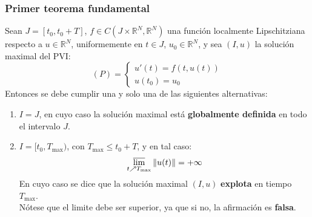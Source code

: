 \subsubsection{Primer teorema fundamental}

\begin{teorema}
    Sean $J = [t_0, t_0 + T]$, $f \in C(J \times \mathbb{R}^N, \mathbb{R}^N)$ una función localmente Lipschitziana respecto a $u \in \mathbb{R}^N$, uniformemente en $t \in J$, $u_0 \in \mathbb{R}^N$, y sea $(I, u)$ la solución maximal del PVI:
    \[
        (P) =
        \begin{cases}
            u'(t) = f(t, u(t)) \\
            u(t_0) = u_0
        \end{cases}
    \]
    Entonces se debe cumplir una y solo una de las siguientes alternativas:
    \begin{enumerate}
        \item $I=J$, en cuyo caso la solución maximal está \textbf{globalmente definida} en todo el intervalo $J$.
        \item $I = [t_0, T_{\text{max}})$, con $T_{\text{max}} \leq t_0 + T$, y en tal caso:
        \[
            \varlimsup_{t \nearrow T_{\text{max}}} \| u(t) \| = +\infty
        \]
        En cuyo caso se dice que la solución maximal $(I, u)$ \textbf{explota} en tiempo $T_{\text{max}}$.\\
        Nótese que el limite debe ser superior, ya que si no, la afirmación es \textbf{falsa}.
    \end{enumerate}
\end{teorema}

